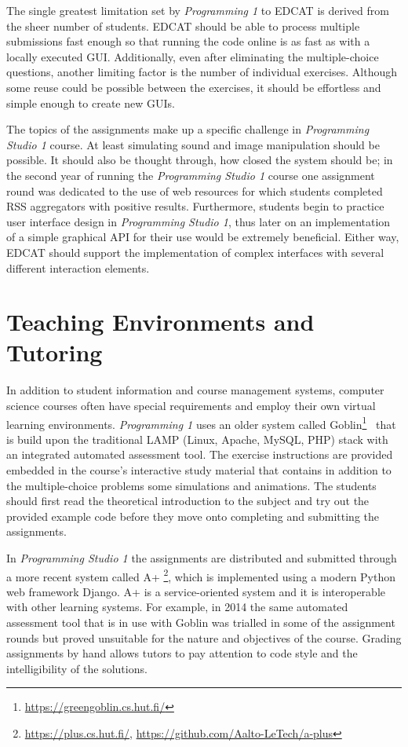 The single greatest limitation set by \emph{Programming 1} to EDCAT is derived from the sheer number of students. EDCAT should be able to process multiple submissions fast enough so that running the code online is as fast as with a locally executed GUI. Additionally, even after eliminating the multiple-choice questions, another limiting factor is the number of individual exercises. Although some reuse could be possible between the exercises, it should be effortless and simple enough to create new GUIs.

The topics of the assignments make up a specific challenge in \emph{Programming Studio 1} course. At least simulating sound and image manipulation should be possible. It should also be thought through, how closed the system should be; in the second year of running the \emph{Programming Studio 1} course one assignment round was dedicated to the use of web resources for which students completed RSS aggregators with positive results. Furthermore, students begin to practice user interface design in \emph{Programming Studio 1}, thus later on an implementation of a simple graphical API for their use would be extremely beneficial. Either way, EDCAT should support the implementation of complex interfaces with several different interaction elements.


\section{Teaching Environments and Tutoring}

In addition to student information and course management systems, computer science courses often have special requirements and employ their own virtual learning environments. \emph{Programming 1} uses an older system called Goblin\footnote{ \url{https://greengoblin.cs.hut.fi/}}~\cite{hiisila:2005} that is build upon the traditional LAMP (Linux, Apache, MySQL, PHP) stack with an integrated automated assessment tool. The exercise instructions are provided embedded in the course's interactive study material that contains in addition to the multiple-choice problems some simulations and animations. The students should first read the theoretical introduction to the subject and try out the provided example code before they move onto completing and submitting the assignments.

In \emph{Programming Studio 1} the assignments are distributed and submitted through a more recent system called A+ \footnote{ \url{https://plus.cs.hut.fi/}, \url{https://github.com/Aalto-LeTech/a-plus}}, which is implemented using a modern Python web framework Django. A+ is a service-oriented system and it is interoperable with other learning systems. For example, in 2014 the same automated assessment tool that is in use with Goblin was trialled in some of the assignment rounds but proved unsuitable for the nature and objectives of the course. Grading assignments by hand allows tutors to pay attention to code style and the intelligibility of the solutions.

